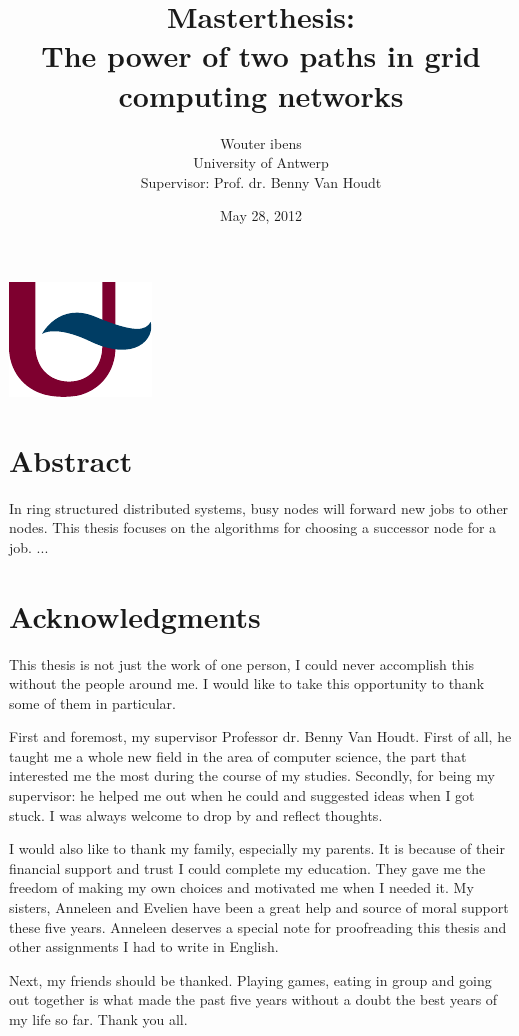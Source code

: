 \documentclass[10pt,a4paper]{article}
\author{Wouter ibens \\ University of Antwerp \\ Supervisor: Prof. dr. Benny Van Houdt}
\title{Masterthesis: \\ The power of two paths in grid computing networks}
\date{May 28, 2012}
\begin{document}
\vspace{8em}
\maketitle
\thispagestyle{empty}
\vspace{32em}
\begin{center}
\includegraphics[scale=1.0]{resources/ua.pdf}
\end{center}
\newpage

\section*{Abstract}
In ring structured distributed systems, busy nodes will forward new jobs to other nodes. This thesis focuses on the algorithms for choosing a successor node for a job. ...

\newpage

\section*{Acknowledgments}
This thesis is not just the work of one person, I could never accomplish this without the people around me. I would like to take this opportunity to thank some of them in particular.

First and foremost, my supervisor Professor dr. Benny Van Houdt. First of all, he taught me a whole new field in the area of computer science, the part that interested me the most during the course of my studies. Secondly, for being my supervisor: he helped me out when he could and suggested ideas when I got stuck. I was always welcome to drop by and reflect thoughts.

I would also like to thank my family, especially my parents. It is because of their financial support and trust I could complete my education. They gave me the freedom of making my own choices and motivated me when I needed it. My sisters, Anneleen and Evelien have been a great help and source of moral support these five years. Anneleen deserves a special note for proofreading this thesis and other assignments I had to write in English.

Next, my friends should be thanked. Playing games, eating in group and going out together is what made the past five years without a doubt the best years of my life so far. Thank you all.
\end{document}

